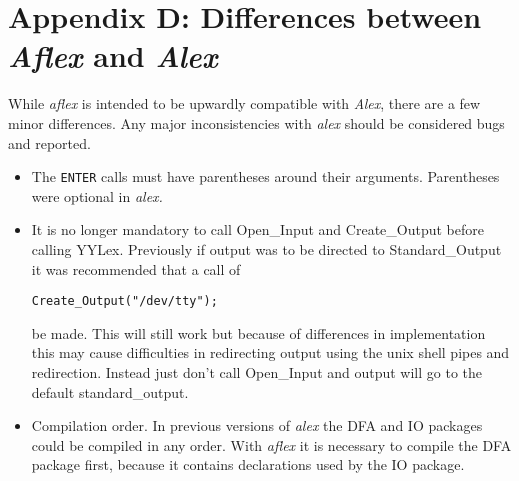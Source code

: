 \section{Appendix D: Differences between {\sl Aflex} and {\sl Alex}}
\label{alexdiff}
While {\sl aflex} is intended to be upwardly compatible with {\sl
Alex}, there are a few minor differences.  Any major inconsistencies
with {\sl alex} should be considered bugs and reported.
\begin{itemize}
 \item  The {\tt ENTER} calls must have parentheses around their
arguments.  Parentheses were optional in {\sl alex.}

 \item  It is no longer mandatory to call Open\_Input and Create\_Output
before calling YYLex.  Previously if output was to be directed to
Standard\_Output it was recommended that a call of
\begin{verbatim}
Create_Output("/dev/tty");
\end{verbatim}
be made.  This will still work but because of differences in
implementation this may cause difficulties in redirecting output using
the {\sc unix} shell pipes and redirection.  Instead just don't call
Open\_Input and output will go to the default {\sc standard\_output.}

 \item	Compilation order.  In previous versions of {\sl alex} the DFA
and IO packages could be compiled in any order.  With {\sl aflex} it
is necessary to compile the DFA package first, because it contains
declarations used by the IO package.

\end{itemize}

\newpage
